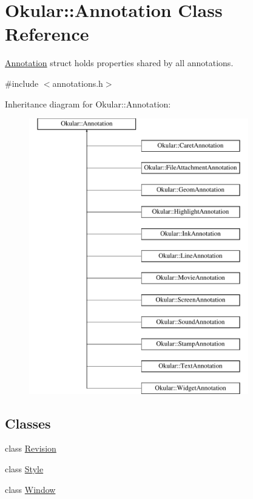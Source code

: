 \hypertarget{classOkular_1_1Annotation}{\section{Okular\+:\+:Annotation Class Reference}
\label{classOkular_1_1Annotation}
}


\hyperlink{classOkular_1_1Annotation}{Annotation} struct holds properties shared by all annotations.  




{\ttfamily \#include $<$annotations.\+h$>$}

Inheritance diagram for Okular\+:\+:Annotation\+:\begin{figure}[H]
\begin{center}
\leavevmode
\includegraphics[height=12.000000cm]{classOkular_1_1Annotation}
\end{center}
\end{figure}
\subsection*{Classes}
\begin{DoxyCompactItemize}
\item 
class \hyperlink{classOkular_1_1Annotation_1_1Revision}{Revision}
\item 
class \hyperlink{classOkular_1_1Annotation_1_1Style}{Style}
\item 
class \hyperlink{classOkular_1_1Annotation_1_1Window}{Window}
\end{DoxyCompactItemize}
